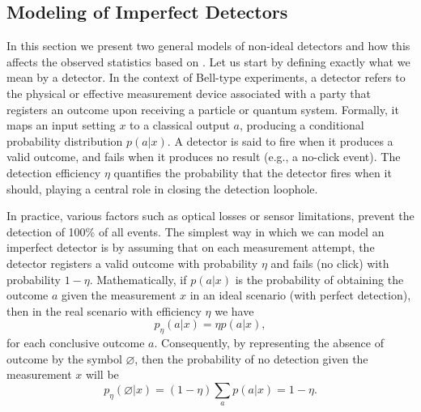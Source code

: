 \documentclass[aps,pra,reprint, superscriptaddress,showkeys]{revtex4-2}
\theoremstyle{plain}
\begin{document}


\subsection{Modeling of Imperfect Detectors}\label{sec:ND_models}

In this section we present two general models of non-ideal detectors and how this affects the observed statistics based on \cite{Wilms2008}. Let us start by defining exactly what we mean by a detector.  In the context of Bell-type experiments, a detector refers to the physical or effective measurement device associated with a party that registers an outcome upon receiving a particle or quantum system. Formally, it maps an input setting $x$ to a classical output $a$, producing a conditional probability distribution $p(a|x)$. A detector is said to fire when it produces a valid outcome, and fails when it produces no result (e.g., a no-click event). The detection efficiency $\eta$ quantifies the probability that the detector fires when it should, playing a central role in closing the detection loophole.


In practice, various factors such as optical losses or  sensor limitations, prevent the detection of 100\% of all events. The simplest way in which we can model an imperfect  detector is by assuming that on each measurement attempt, the detector  registers a valid outcome with probability $\eta$ and fails (no click) with 
probability $1-\eta$. Mathematically, if $p(a|x)$ is the probability of obtaining the outcome $a$ given the measurement $x$ in an ideal scenario (with perfect detection), then in the real scenario with efficiency $\eta$ we have
\begin{equation}
    p_{\eta}(a|x) = \eta p(a|x),
\end{equation}
for each conclusive outcome $a$. Consequently, by representing the absence of outcome  by the symbol $\varnothing$, then the probability of no detection given the measurement $x$ will be
\begin{equation}
    p_{\eta}(\varnothing|x) = (1 - \eta) \sum_a p(a|x) =1-\eta.
\end{equation}
\end{document}
